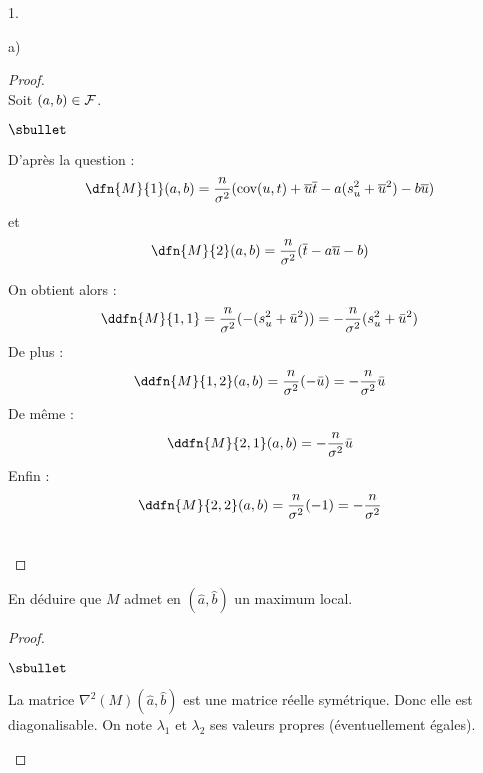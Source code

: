 \documentclass[11pt]{article}%
\begin{document}
\begin{noliste}{1.}
\begin{noliste}{a)}
  \begin{proof}~\\
   Soit $(a,b) \in {\cal F}$.
   \begin{noliste}{$\sbullet$}
    \item D'après la question  :
    \[
     \dfn{M}{1}(a,b) = \dfrac{n}{\sigma^2}(\text{cov}(u,t) +
    \overline{u}\overline{t}-a(s_u^2 + \overline{u}^2)-b\overline{u})
    \]
    et
    \[
     \dfn{M}{2}(a,b) = \dfrac{n}{\sigma^2}(\overline{t}-a\overline{u}-b)
    \]
    
    \item On obtient alors :
    \[
     \ddfn{M}{1,1} = \dfrac{n}{\sigma^2}(-(s_u^2+ \bar{u}^2)) = 
     -\dfrac{n}{\sigma^2}(s_u^2+ \bar{u}^2)
    \]
    De plus :
    \[
     \ddfn{M}{1,2}(a,b) = \dfrac{n}{\sigma^2}(-\bar{u}) = 
     -\dfrac{n}{\sigma^2} \bar{u}
    \]
    De même :
    \[
     \ddfn{M}{2,1}(a,b) = -\dfrac{n}{\sigma^2} \bar{u}
    \]
    Enfin :
    \[
     \ddfn{M}{2,2}(a,b) = \dfrac{n}{\sigma^2}(-1) = 
     -\dfrac{n}{\sigma^2}
    \]
   \end{noliste}
   ~\\[-1cm]
  \end{proof}
    
  \item En déduire que $M$ admet en $(\hat{a},\hat{b})$ un maximum 
  local.
  
  \begin{proof}~
   \begin{noliste}{$\sbullet$}
    \item La matrice $\nabla^2(M)(\hat{a}, \hat{b})$ est une matrice
    réelle symétrique. Donc elle est diagonalisable. On note 
    $\lambda_1$ et $\lambda_2$ ses valeurs propres 
    (éventuellement égales).
    

\end{noliste}
\end{proof}
\end{noliste}
\end{noliste}
\end{document}
